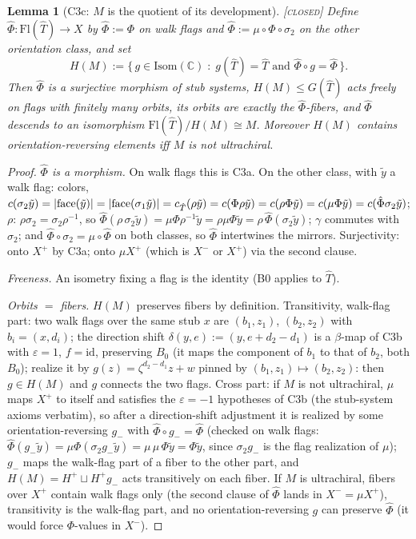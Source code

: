 \documentclass[11pt]{article}
\newtheorem{lemma}[theorem]{Lemma}
\theoremstyle{definition}
\newcommand{\CLOSED}{\textnormal{\textsc{[closed]}}}
\newcommand{\Flags}{\mathrm{Fl}}
\newcommand{\C}{\mathbb{C}}
\newcommand{\Isom}{\mathrm{Isom}}
\begin{document}
\begin{lemma}[C3c: $M$ is the quotient of its development]\label{lem:C3c} \CLOSED\;
Define $\hat\Phi : \Flags(\hat T) \to X$ by $\hat\Phi := \Phi$ on walk flags and
$\hat\Phi := \mu \circ \Phi \circ \sigma_2$ on the other orientation class, and set
\[
H(M) := \{\, g \in \Isom(\C) \;:\; g(\hat T) = \hat T \text{ and }
\hat\Phi \circ g = \hat\Phi \,\}.
\]
Then $\hat\Phi$ is a surjective morphism of stub systems, $H(M) \le G(\hat T)$ acts
freely on flags with finitely many orbits, its orbits are exactly the $\hat\Phi$-fibers,
and $\hat\Phi$ descends to an isomorphism $\Flags(\hat T)/H(M) \cong M$. Moreover
$H(M)$ contains orientation-reversing elements iff $M$ is not ultrachiral.
\end{lemma}

\begin{proof}
\emph{$\hat\Phi$ is a morphism.} On walk flags this is C3a. On the other class, with
$\tilde y$ a walk flag: colors,
$c(\sigma_2\tilde y) = |{\rm face}(\tilde y)| = |{\rm face}(\sigma_1 \tilde y)| =
c_{\hat T}(\rho\tilde y) = c(\Phi\rho\tilde y) = c(\rho\Phi\tilde y) =
c(\mu\Phi\tilde y) = c(\hat\Phi \sigma_2\tilde y)$;
$\rho$: $\rho\sigma_2 = \sigma_2\rho^{-1}$, so
$\hat\Phi(\rho\,\sigma_2\tilde y) = \mu\Phi\rho^{-1}\tilde y = \rho\mu\Phi\tilde y
= \rho\,\hat\Phi(\sigma_2\tilde y)$; $\gamma$ commutes with $\sigma_2$; and
$\hat\Phi \circ \sigma_2 = \mu \circ \hat\Phi$ on both classes, so $\hat\Phi$
intertwines the mirrors. Surjectivity: onto $X^+$ by C3a; onto $\mu X^+$ (which is
$X^-$ or $X^+$) via the second clause.

\emph{Freeness.} An isometry fixing a flag is the identity (B0 applies to $\hat T$).

\emph{Orbits $=$ fibers.} $H(M)$ preserves fibers by definition. Transitivity, walk-flag
part: two walk flags over the same stub $x$ are $(b_1, z_1)$, $(b_2, z_2)$ with
$b_i = (x, d_i)$; the direction shift $\delta(y,e) := (y, e + d_2 - d_1)$ is a
$\beta$-map of C3b with $\varepsilon = 1$, $f = \mathrm{id}$, preserving $B_0$ (it maps
the component of $b_1$ to that of $b_2$, both $B_0$); realize it by
$g(z) = \zeta^{d_2-d_1} z + w$ pinned by $(b_1,z_1) \mapsto (b_2,z_2)$: then
$g \in H(M)$ and $g$ connects the two flags. Cross part: if $M$ is not ultrachiral,
$\mu$ maps $X^+$ to itself and satisfies the $\varepsilon = -1$ hypotheses of C3b (the
stub-system axioms verbatim), so after a direction-shift adjustment it is realized by
some orientation-reversing $g_-$ with $\hat\Phi \circ g_- = \hat\Phi$ (checked on walk
flags: $\hat\Phi(g_-\tilde y) = \mu\Phi(\sigma_2 g_- \tilde y) = \mu\,\mu\,\Phi\tilde y
= \Phi\tilde y$, since $\sigma_2 g_-$ is the flag realization of $\mu$); $g_-$ maps the
walk-flag part of a fiber to the other part, and $H(M) = H^+ \sqcup H^+ g_-$ acts
transitively on each fiber. If $M$ is ultrachiral, fibers over $X^+$ contain walk flags
only (the second clause of $\hat\Phi$ lands in $X^- = \mu X^+$), transitivity is the
walk-flag part, and no orientation-reversing $g$ can preserve $\hat\Phi$ (it would force
$\Phi$-values in $X^-$).


\end{proof}
\end{document}

